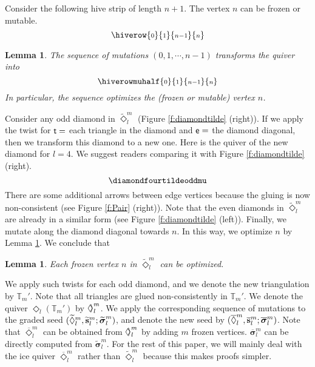 \documentclass{amsart}
\newtheorem{lemma}[theorem]{Lemma}
\theoremstyle{definition}
\theoremstyle{remark}
\numberwithin{equation}{section}
\newcommand{\mb}[1]{\mathbb{#1}}
\renewcommand{\b}[1]{\bold{#1}}
\newcommand{\bs}[1]{\boldsymbol{#1}}
\newcommand{\br}[1]{\overline{#1}}
\newcommand{\wtd}[1]{\widetilde{#1}}
\newcommand{\e}{{\sf e}}
\renewcommand{\t}{{\sf t}}
\newcommand{\invint}[1]{{\scriptsize \overleftarrow{[#1]}}}
\renewcommand{\ss}[1]{{\scriptstyle{#1}}}
\newcommand{\Diamondsh}{\mathrel{\Diamond\!\!\raisebox{0.45pt}{$\rangle$}}}
\begin{document}
Consider the following hive strip of length $n+1$. The vertex $n$ can be frozen or mutable.
$$\hiverow{\ss 0}{\ss 1}{\ss{n-1}}{\ss n}$$

\begin{lemma} \label{L:hiverow} The sequence of mutations $(0,1,\cdots,n-1)$ transforms the quiver %
	into $$\hiverowmuhalf{\ss 0}{\ss 1}{\ss{n-1}}{\ss{n}}$$
	In particular, the sequence optimizes the (frozen or mutable) vertex $n$.
\end{lemma}


Consider any odd diamond in $\wtd{\Diamond}_l^m$ (Figure \ref{f:diamondtilde} (right)). 
If we apply the twist for $\t=$ each triangle in the diamond and $\e=$ the diamond diagonal, then we transform this diamond to a new one.
Here is the quiver of the new diamond for $l=4$. We suggest readers comparing it with Figure \ref{f:diamondtilde} (right).
$$\diamondfourtildeoddmu$$
There are some additional arrows between edge vertices because the gluing is now non-consistent (see Figure \ref{f:Pair} (right)).
Note that the even diamonds in $\wtd{\Diamond}_l^m$ are already in a similar form (see Figure \ref{f:diamondtilde} (left)).
Finally, we mutate along the diamond diagonal towards $n$.
In this way, we optimize $n$ by Lemma \ref{L:hiverow}. We conclude that
\begin{lemma} \label{L:optdet} Each frozen vertex $n$ in $\wtd{\Diamond}_l^m$ can be optimized.
\end{lemma}

We apply such twists for each odd diamond, and we denote the new triangulation by $\mb{T}_m'$.
Note that all triangles are glued non-consistently in $\mb{T}_m'$.
We denote the quiver $\Diamond_l(\mb{T}_m')$ by $\Diamondsh_l^m$.
We apply the corresponding sequence of mutations to the graded seed $(\wtd{\Diamond}_l^m,\wtd{\b{s}}_l^m; \wtd{\bs{\sigma}}_l^m)$, and denote the new seed by $(\br{\Diamond}_l^m,\br{\b{s}}_l^m; \br{\bs{\sigma}}_l^m)$.
Note that $\br{\Diamond}_l^m$ can be obtained from $\Diamondsh_l^m$ by adding $m$ frozen vertices.
$\br{\bs{\sigma}}_l^m$ can be directly computed from $\wtd{\bs{\sigma}}_l^m$.
For the rest of this paper, we will mainly deal with the ice quiver $\br{\Diamond}_l^m$ rather than $\wtd{\Diamond}_l^m$ because this makes proofs simpler.
\end{document}
